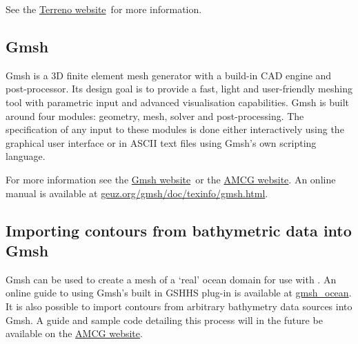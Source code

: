 See the \href{http://amcg.ese.ic.ac.uk/terreno}{Terreno website}\ for more information.

\subsection{Gmsh}
\label{sec:meshing_tools_non_fluidity_gmsh}

Gmsh is a 3D finite element mesh generator with a build-in CAD engine and post-processor.
Its design goal is to provide a fast, light and user-friendly meshing tool with parametric
input and advanced visualisation capabilities. Gmsh is built around four modules: geometry, 
mesh, solver and post-processing. The specification of any input to these modules is done
either interactively using the graphical user interface or in ASCII text files using Gmsh's
own scripting language. 

For more information see the \href{http://geuz.org/gmsh/}{Gmsh website}\ or the \href{http://amcg.ese.ic.ac.uk}{AMCG
website}. An online manual is available at \href{http://geuz.org/gmsh/doc/texinfo/gmsh.html}{geuz.org/gmsh/doc/texinfo/gmsh.html}.

\subsection{Importing contours from bathymetric data into Gmsh}

Gmsh can be used to create a mesh of a `real' ocean domain for use with \fluidity. An online guide to using Gmsh's built in
GSHHS plug-in is available at \href{http://perso.uclouvain.be/jonathan.lambrechts/gmsh_ocean/}{gmsh\_ocean}.
It is also possible to import contours from arbitrary bathymetry data sources into Gmsh. A guide and sample code detailing this process will
in the future be available on the \href{http://amcg.ese.ic.ac.uk}{AMCG website}.
